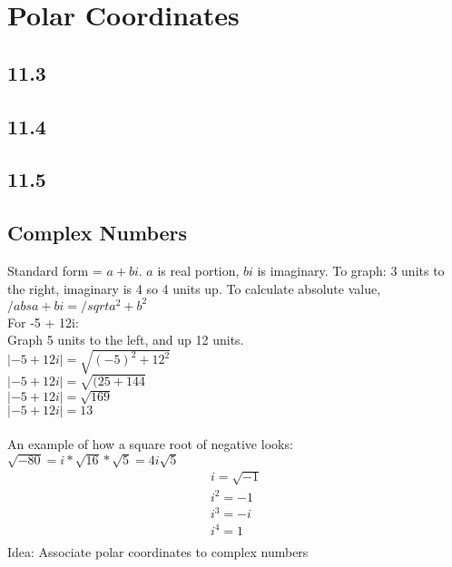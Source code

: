\documentclass{article}
\begin{document}
    \section{Polar Coordinates}
        \subsection*{11.3}
        \subsection*{11.4}
        \subsection*{11.5}
        \color{Aquamarine}
        \subsection*{Complex Numbers}
            Standard form = $a + bi$. $a$ is real portion, $bi$ is imaginary. 
            To graph: 3 units to the right, imaginary is 4 so 4 units up. To calculate absolute value, $/abs{a+bi} = /sqrt{a^2 + b^2}$\\
            For -5 + 12i: \\
            Graph 5 units to the left, and up 12 units. \\
            $\lvert {-5 + 12i}\rvert = \sqrt{(-5)^2 + 12^2}$ \\
            $\lvert {-5 + 12i}\rvert = \sqrt{(25 + 144}$ \\
            $\lvert {-5 + 12i}\rvert = \sqrt{169}$ \\
            $\lvert {-5 + 12i}\rvert = 13$ \\
            \\
            An example of how a square root of negative looks: $\sqrt{-80} =  i * \sqrt{16} * \sqrt{5} = 4i \sqrt{5}$
            \begin{equation}
                \begin{split}
                    i = \sqrt{-1} \\
                    i^2 = -1 \\
                    i^3 = -i \\
                    i^4 = 1 \\
                \end{split}
            \end{equation}
            Idea: Associate polar coordinates to complex numbers \\
\end{document}
